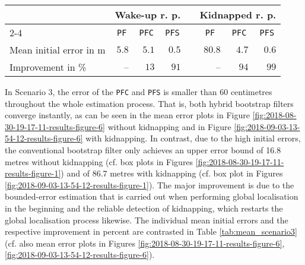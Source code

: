 \begin{table*}\centering
{}
\begin{tabular}{@{}lrrrrrrr@{}}\toprule
& \multicolumn{3}{c}{Wake-up r. p.} & \phantom{a} & \multicolumn{3}{c}{Kidnapped r. p.} \\ 
\cmidrule{2-4} \cmidrule{6-8}
 & \multicolumn{1}{c}{\texttt{PF}} & \multicolumn{1}{c}{\texttt{PFC}} & \multicolumn{1}{c}{\texttt{PFS}} & & \multicolumn{1}{c}{\texttt{PF}} & \multicolumn{1}{c}{\texttt{PFC}} & \multicolumn{1}{c}{\texttt{PFS}} \\
\midrule 
Mean initial error in m & $5.8$ & $5.1$ & $0.5$ & & $80.8$ & $4.7$ & $0.6$ \\              
Improvement in \%  & -- & $13$ & $91$ & & -- & $94$ & $99$ \\ 
\bottomrule
\end{tabular}
\caption{Mean initial errors and errors after kidnapping for the bootstrap filters in Scenario 2.}
\label{tab:mean_scenario2}
\end{table*}



In Scenario 3, the error of the \texttt{PFC} and \texttt{PFS} is smaller than 60 centimetres throughout the whole estimation process. That is, both hybrid bootstrap filters converge instantly, as can be seen in the mean error plots in Figure \ref{fig:2018-08-30-19-17-11-results-figure-6} without kidnapping and in Figure \ref{fig:2018-09-03-13-54-12-results-figure-6} with kidnapping. In contrast, due to the high initial errors, the conventional bootstrap filter only achieves an upper error bound of 16.8 metres without kidnapping (cf. box plots in Figures \ref{fig:2018-08-30-19-17-11-results-figure-1}) and of 86.7 metres with kidnapping (cf. box plot in Figures \ref{fig:2018-09-03-13-54-12-results-figure-1}). The major improvement is due to the bounded-error estimation that is carried out when performing global localisation in the beginning and the reliable detection of kidnapping, which restarts the global localisation process likewise. The individual mean initial errors and the respective improvement in percent are contrasted in Table \ref{tab:mean_scenario3} (cf. also mean error plots in Figures \ref{fig:2018-08-30-19-17-11-results-figure-6}, \ref{fig:2018-09-03-13-54-12-results-figure-6}).


